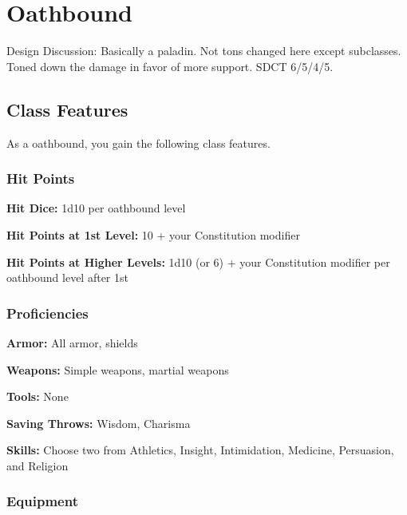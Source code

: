 \section{Oathbound\label{class:oathbound}}

Design Discussion: Basically a paladin. Not tons changed here except subclasses. Toned down the damage in favor of more support. SDCT 6/5/4/5.

\subsection{Class Features}

As a oathbound, you gain the following class features.

\subsubsection{Hit Points}

\textbf{Hit Dice:} 1d10 per oathbound level

\textbf{Hit Points at 1st Level:} 10 + your Constitution modifier

\textbf{Hit Points at Higher Levels:} 1d10 (or 6) + your Constitution modifier per oathbound level after 1st

\subsubsection{Proficiencies}

\textbf{Armor:} All armor, shields

\textbf{Weapons:} Simple weapons, martial weapons

\textbf{Tools:} None

\textbf{Saving Throws:} Wisdom, Charisma

\textbf{Skills:} Choose two from Athletics, Insight, Intimidation, Medicine, Persuasion, and Religion

\subsubsection{Equipment}

